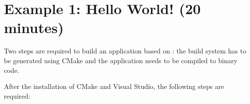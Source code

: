 %
% 
%
%
%
%

\section{Example 1: Hello World! (20 minutes)}
\label{sec:example_helloworld}

Two steps are required to build an application based on \xme:
the build system has to be generated using CMake and the application needs to be compiled to binary code.

After the installation of CMake and Visual Studio, the following steps are required:

